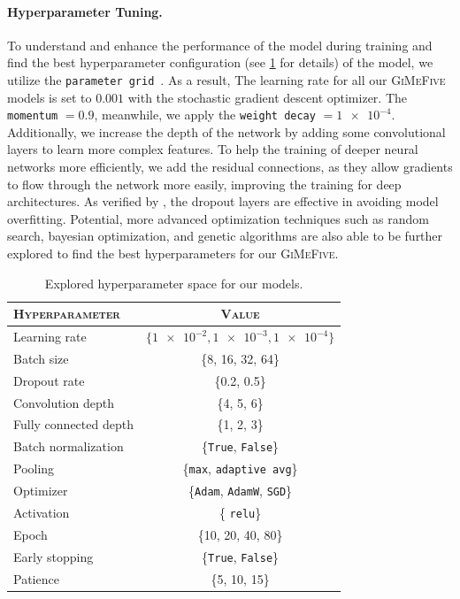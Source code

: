 \paragraph{Hyperparameter Tuning.}
To understand and enhance the performance of the model during training 
and find the best hyperparameter configuration (see \cref{tab:hyper} for details) of the model, 
we utilize the \texttt{parameter grid}~\cite{parameterGrid}. 
As a result, 
The learning rate for all our \textsc{GiMeFive} models is set to $0.001$ with the stochastic gradient descent optimizer. 
The \texttt{momentum} $=0.9$, 
meanwhile, we apply the \texttt{weight decay} $ = \num{1e-4}$. 
Additionally, 
we increase the depth of the network by adding some convolutional layers to learn more complex features. 
To help the training of deeper neural networks more efficiently, 
we add the residual connections, 
as they allow gradients to flow through the network more easily, 
improving the training for deep architectures. 
As verified by \citet{BarsoumZCZ16}, 
the dropout layers are effective in avoiding model overfitting. 
Potential, 
more advanced optimization techniques such as random search, bayesian optimization, 
and genetic algorithms are also able to be further explored to find the best hyperparameters for our \textsc{GiMeFive}.

\begin{table}[ht]
  \centering
  \begin{tabular}{@{}lc@{}}
    \toprule
    \textsc{Hyperparameter} & \textsc{Value} \\
    \midrule
    Learning rate & $ \{\num{1e-2}, \num{1e-3}, \num{1e-4} \} $ \\
    Batch size & \{8, 16, 32, 64\} \\
    Dropout rate & \{0.2, 0.5\} \\
    Convolution depth & \{4, 5, 6\} \\
    Fully connected depth & \{1, 2, 3\} \\
    Batch normalization & \{\texttt{True}, \texttt{False}\} \\
    Pooling & \{\texttt{max}, \texttt{adaptive avg}\} \\
    Optimizer & \{\texttt{Adam}, \texttt{AdamW}, \texttt{SGD}\} \\
    Activation & \{ \texttt{relu}\} \\ %
    Epoch & \{10, 20, 40, 80\} \\
    Early stopping & \{\texttt{True}, \texttt{False}\} \\
    Patience & \{5, 10, 15\} \\
    \bottomrule
  \end{tabular}
  \caption{Explored hyperparameter space for our models.}
  \label{tab:hyper}
\end{table}


